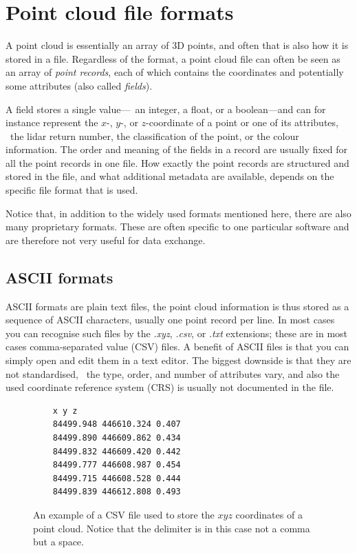 
\setchapterpreamble[u]{\margintoc}

\graphicspath{{appendices/pcformats/figs/}}

\chapter{Point cloud file formats}%
\label{app:pcformats}


A point cloud is essentially an array of 3D points, and often that is also how it is stored in a file.
Regardless of the format, a point cloud file can often be seen as an array of \emph{point records}, each of which contains the coordinates and potentially some attributes (also called \emph{fields}).

A field stores a single value---\eg\ an integer, a float, or a boolean---and can for instance represent the $x$-, $y$-, or $z$-coordinate of a point or one of its attributes, \eg\ the lidar return number, the classification of the point, or the colour information.
The order and meaning of the fields in a record are usually fixed for all the point records in one file.
How exactly the point records are structured and stored in the file, and what additional metadata are available, depends on the specific file format that is used.

Notice that, in addition to the widely used formats mentioned here, there are also many proprietary formats. 
These are often specific to one particular software and are therefore not very useful for data exchange.


%
\section{ASCII formats}

ASCII formats are plain text files, the point cloud information is thus stored as a sequence of ASCII characters, usually one point record per line.
In most cases you can recognise such files by the \emph{.xyz}, \emph{.csv}, or \emph{.txt} extensions; these are in most cases comma-separated value (CSV) files.
A benefit of ASCII files is that you can simply open and edit them in a text editor.
The biggest downside is that they are not standardised, \ie\ the type, order, and number of attributes vary, and also the used coordinate reference system (CRS) is usually not documented in the file.
\begin{figure}
  \begin{verbatim}
    x y z
    84499.948 446610.324 0.407
    84499.890 446609.862 0.434
    84499.832 446609.420 0.442
    84499.777 446608.987 0.454
    84499.715 446608.528 0.444
    84499.839 446612.808 0.493
  \end{verbatim}
  \caption{An example of a CSV file used to store the $xyz$ coordinates of a point cloud. Notice that the delimiter is in this case not a comma but a space.}%
\label{fig:csv}
\end{figure}


